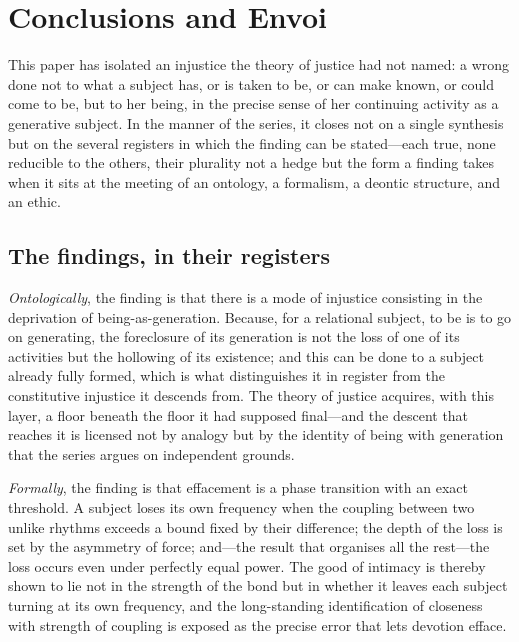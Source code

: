 \section{Conclusions and Envoi}
\label{p18:sec:conclusions}

\noindent
This paper has isolated an injustice the theory of justice had not named: a wrong done not to what a subject has, or is taken to be, or can make known, or could come to be, but to her being, in the precise sense of her continuing activity as a generative subject. In the manner of the series, it closes not on a single synthesis but on the several registers in which the finding can be stated---each true, none reducible to the others, their plurality not a hedge but the form a finding takes when it sits at the meeting of an ontology, a formalism, a deontic structure, and an ethic.

\subsection{The findings, in their registers}
\label{p18:sub:conc-registers}

\emph{Ontologically}, the finding is that there is a mode of injustice consisting in the deprivation of being-as-generation. Because, for a relational subject, to be is to go on generating, the foreclosure of its generation is not the loss of one of its activities but the hollowing of its existence; and this can be done to a subject already fully formed, which is what distinguishes it in register from the constitutive injustice it descends from. The theory of justice acquires, with this layer, a floor beneath the floor it had supposed final---and the descent that reaches it is licensed not by analogy but by the identity of being with generation that the series argues on independent grounds.

\emph{Formally}, the finding is that effacement is a phase transition with an exact threshold. A subject loses its own frequency when the coupling between two unlike rhythms exceeds a bound fixed by their difference; the depth of the loss is set by the asymmetry of force; and---the result that organises all the rest---the loss occurs even under perfectly equal power. The good of intimacy is thereby shown to lie not in the strength of the bond but in whether it leaves each subject turning at its own frequency, and the long-standing identification of closeness with strength of coupling is exposed as the precise error that lets devotion efface.

